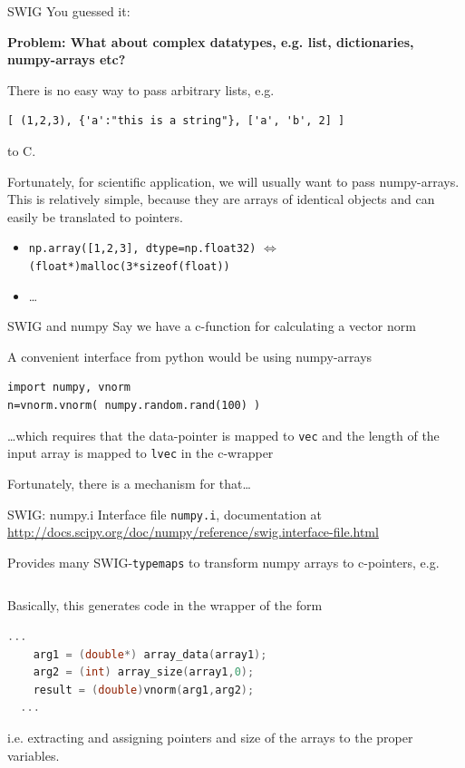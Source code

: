 \documentclass[german]{beamer}
\begin{document}
\begin{frame}[fragile]{SWIG}
You guessed it: 

\begin{center}
  {\bf Problem: What about complex datatypes, e.g. list, dictionaries,
    numpy-arrays etc?}
\end{center}
There is no easy way to pass arbitrary lists, e.g.

\begin{lstlisting}
[ (1,2,3), {'a':"this is a string"}, ['a', 'b', 2] ]
\end{lstlisting}
to C.

Fortunately, for scientific application, we will usually want to pass
numpy-arrays. This is relatively simple, because they are
arrays of identical objects and can easily be translated to pointers.

\begin{itemize}
\item {\tt np.array([1,2,3], dtype=np.float32)} $\Leftrightarrow$ {\tt
  (float*)malloc(3*sizeof(float))}
\item \ldots
\end{itemize}

\end{frame}

\begin{frame}[fragile]{SWIG and numpy}
Say we have a c-function for calculating a vector norm

A convenient interface from python would be using numpy-arrays
\begin{lstlisting}
import numpy, vnorm
n=vnorm.vnorm( numpy.random.rand(100) )
\end{lstlisting}
\ldots which requires that the data-pointer is mapped to {\tt *vec} and
the length of the input array is mapped to {\tt lvec} in the c-wrapper

Fortunately, there is a mechanism for that\ldots

\end{frame}


\begin{frame}[fragile]{SWIG: numpy.i}
Interface file {\tt numpy.i}, documentation at 
\url{http://docs.scipy.org/doc/numpy/reference/swig.interface-file.html}

Provides many SWIG-{\tt typemaps} to transform numpy arrays to
c-pointers, e.g.
\begin{lstlisting}[language=c]
%apply (double* IN_ARRAY1, int DIM1) {(double* vec, int lvec)};
\end{lstlisting}
Basically, this generates code in the wrapper of the form 
\begin{lstlisting}[language=c]
  ...
    arg1 = (double*) array_data(array1);
    arg2 = (int) array_size(array1,0);
    result = (double)vnorm(arg1,arg2);
  ...
\end{lstlisting}
i.e. extracting and assigning pointers and size of the arrays to the
proper variables.
\end{frame}
\end{document}
